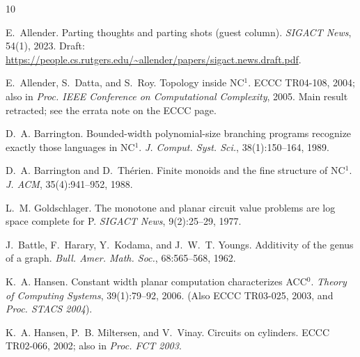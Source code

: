 \documentclass[11pt]{article}
\theoremstyle{definition}
\theoremstyle{remark}
\begin{document}
\begin{thebibliography}{10}

E.~Allender.
\newblock Parting thoughts and parting shots (guest column).
\newblock \emph{SIGACT News}, 54(1), 2023.
\newblock Draft: \url{https://people.cs.rutgers.edu/~allender/papers/sigact.news.draft.pdf}.

E.~Allender, S.~Datta, and S.~Roy.
\newblock Topology inside {NC}$^1$.
\newblock ECCC TR04-108, 2004; also in \emph{Proc. IEEE Conference on Computational Complexity}, 2005.
\newblock Main result retracted; see the errata note on the ECCC page.

D.~A. Barrington.
\newblock Bounded-width polynomial-size branching programs recognize exactly those languages in {NC}$^1$.
\newblock \emph{J. Comput. Syst. Sci.}, 38(1):150--164, 1989.

D.~A. Barrington and D.~Th\'erien.
\newblock Finite monoids and the fine structure of {NC}$^1$.
\newblock \emph{J. ACM}, 35(4):941--952, 1988.

L.~M. Goldschlager.
\newblock The monotone and planar circuit value problems are log space complete for {P}.
\newblock \emph{SIGACT News}, 9(2):25--29, 1977.

J.~Battle, F.~Harary, Y.~Kodama, and J.~W.~T. Youngs.
\newblock Additivity of the genus of a graph.
\newblock \emph{Bull. Amer. Math. Soc.}, 68:565--568, 1962.

K.~A. Hansen.
\newblock Constant width planar computation characterizes {ACC}$^0$.
\newblock \emph{Theory of Computing Systems}, 39(1):79--92, 2006.
\newblock (Also ECCC TR03-025, 2003, and \emph{Proc. STACS 2004}).

K.~A. Hansen, P.~B. Miltersen, and V.~Vinay.
\newblock Circuits on cylinders.
\newblock ECCC TR02-066, 2002; also in \emph{Proc. FCT 2003}.

\end{thebibliography}
\end{document}
